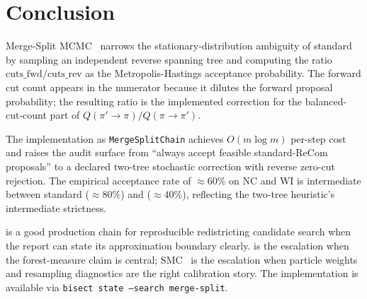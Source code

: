 \section{Conclusion}
\label{sec:conclusion}

Merge-Split MCMC~\citep{janson2022} narrows the stationary-distribution
ambiguity of standard \recom{}~\citep{deford2021} by sampling an independent
reverse spanning tree and computing the ratio
$\mathrm{cuts\_fwd} / \mathrm{cuts\_rev}$ as the Metropolis-Hastings
acceptance probability.
The forward cut count appears in the numerator because it dilutes the
forward proposal probability; the resulting ratio is the implemented
correction for the balanced-cut-count part of
$Q(\pi' \!\to\! \pi) / Q(\pi \!\to\! \pi')$.

The implementation as \texttt{MergeSplitChain} achieves $O(m \log m)$
per-step cost and raises the audit surface from ``always accept feasible
standard-ReCom proposals'' to a declared two-tree stochastic correction with
reverse zero-cut rejection.
The empirical acceptance rate of $\approx\!60\%$ on NC and WI is intermediate
between standard \recom{} ($\approx\!80\%$) and \forestrecom{} ($\approx\!40\%$),
reflecting the two-tree heuristic's intermediate strictness.

\mergesplit{} is a good production chain for reproducible redistricting
candidate search when the report can state its approximation boundary clearly.
\forestrecom{} is the escalation when the forest-measure claim is central;
SMC~\citep{dellaLibera2026smc} is the escalation when particle weights and
resampling diagnostics are the right calibration story.
The implementation is available via \texttt{bisect state --search merge-split}.
